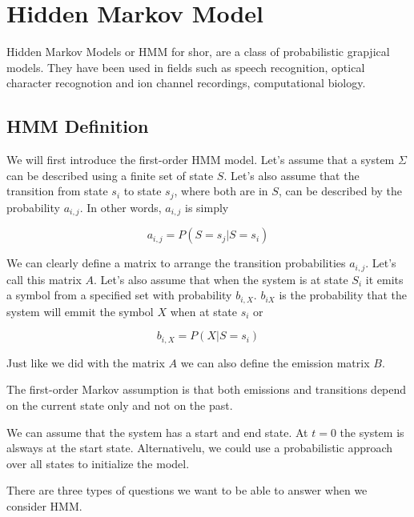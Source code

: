\chapter{Hidden Markov Model}

Hidden Markov Models or HMM for shor, are a class of probabilistic grapjical models.
They have been used in fields such as speech recognition, optical character recognotion and ion channel recordings,
computational biology.

\section{HMM Definition}
We will first introduce the first-order HMM model. Let's assume that a system $\Sigma$ can be described using
a finite set of state $S$. Let's also assume that the transition from state $s_i$ to state $s_j$, where both are in $S$,  can be described by the probability $a_{i,j}$. In other words, $a_{i,j}$
is simply

\begin{equation}
a_{i,j} = P(S=s_j | S=s_i)
\end{equation}


We can clearly define a matrix to arrange the transition probabilities $a_{i,j}$. Let's call this matrix $A$.
Let's also assume that when the system is at state $S_i$ it emits a symbol from a specified set with probability $b_{i,X}$.
$b_{iX}$ is the probability that the system will emmit the symbol $X$ when at state $s_i$ or

\begin{equation}
b_{i,X} = P( X| S=s_i)
\end{equation}
  
Just like we did with the matrix $A$ we can also define the emission matrix $B$.

\begin{framed}
\begin{remark}
The first-order Markov assumption is that both emissions and transitions depend on the current state only and
not on the past.
\end{remark}
\end{framed}

We can assume that the system has a start and end state. At $t=0$ the system is alsways at the start state.
Alternativelu, we could use a probabilistic approach over all states to initialize the model.


There are three types of questions we want to be able to answer when we consider HMM.


